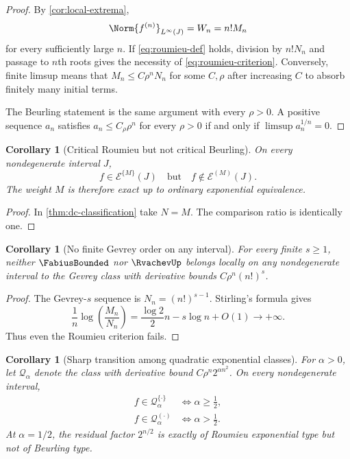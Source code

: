 \documentclass[11pt,a4paper]{article}
\newtheorem{corollary}[theorem]{Corollary}
\theoremstyle{definition}
\theoremstyle{remark}
\newcommand{\Roumieu}[1]{\mathcal{E}^{\{#1\}}}
\newcommand{\Beurling}[1]{\mathcal{E}^{(#1)}}
\begin{document}
\begin{proof}
By \cref{cor:local-extrema},
\[
  \Norm{f^{(n)}}_{L^\infty(J)}=W_n=n!M_n
\]
for every sufficiently large $n$.  If \eqref{eq:roumieu-def} holds, division by
$n!N_n$ and passage to $n$th roots gives the necessity of
\eqref{eq:roumieu-criterion}.  Conversely, finite limsup means that
$M_n\le C\rho^nN_n$ for some $C,\rho$ after increasing $C$ to absorb finitely many
initial terms.

The Beurling statement is the same argument with every $\rho>0$.  A positive
sequence $a_n$ satisfies $a_n\le C_\rho\rho^n$ for every $\rho>0$ if and only if
$\limsup a_n^{1/n}=0$.
\end{proof}

\begin{corollary}[Critical Roumieu but not critical Beurling]
\label{cor:critical-class}
On every nondegenerate interval $J$,
\begin{equation}
  f\in\Roumieu{M}(J)
  \quad\text{but}\quad
  f\notin\Beurling{M}(J).
  \label{eq:critical-not-beurling}
\end{equation}
The weight $M$ is therefore exact up to ordinary exponential equivalence.
\end{corollary}

\begin{proof}
In \cref{thm:dc-classification} take $N=M$.  The comparison ratio is identically
one.
\end{proof}

\begin{corollary}[No finite Gevrey order on any interval]
\label{cor:no-gevery}
For every finite $s\ge1$, neither $\FabiusBounded$ nor $\RvachevUp$ belongs locally on any nondegenerate
interval to the Gevrey class with derivative bounds $C\rho^n(n!)^s$.
\end{corollary}

\begin{proof}
The Gevrey-$s$ sequence is $N_n=(n!)^{s-1}$.  Stirling's formula gives
\[
 \frac1n\log\left(\frac{M_n}{N_n}\right)
 =\frac{\log2}{2}n-s\log n+O(1)\longrightarrow+\infty.
\]
Thus even the Roumieu criterion fails.
\end{proof}

\begin{corollary}[Sharp transition among quadratic exponential classes]
\label{cor:quadratic-classes}
For $\alpha>0$, let $\mathcal Q_\alpha$ denote the class with derivative bound
$C\rho^n2^{\alpha n^2}$.  On every nondegenerate interval,
\begin{align}
 f\in\mathcal Q_\alpha^{\{\cdot\}}
 &\iff \alpha\ge\frac12,
 \label{eq:q-roumieu}\\
 f\in\mathcal Q_\alpha^{(\cdot)}
 &\iff \alpha>\frac12.
 \label{eq:q-beurling}
\end{align}
At $\alpha=1/2$, the residual factor $2^{n/2}$ is exactly of Roumieu exponential
type but not of Beurling type.
\end{corollary}
\end{document}
